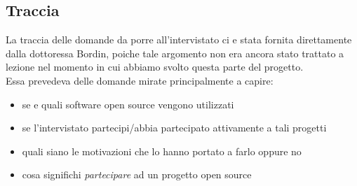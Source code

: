 \documentclass[12pt]{article} %
\begin{document}
\subsection{Traccia}
La traccia delle domande da porre all'intervistato ci e stata fornita direttamente dalla dottoressa Bordin, poiche tale argomento non era ancora stato trattato a lezione nel momento in cui abbiamo svolto questa parte del progetto.\\
Essa prevedeva delle domande mirate principalmente a capire:
\begin{itemize}
\item se e quali software open source vengono utilizzati
\item se l'intervistato partecipi/abbia partecipato attivamente a tali progetti
\item quali siano le motivazioni che lo hanno portato a farlo oppure no
\item cosa significhi \emph{partecipare} ad un progetto open source
\end{itemize}
\end{document}
